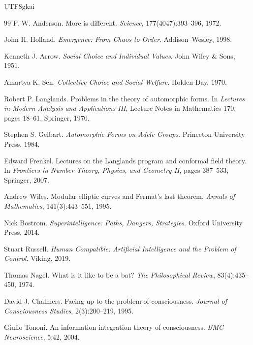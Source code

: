 \documentclass[12pt]{article}
\begin{document}
\begin{CJK*}{UTF8}{gkai}
\begin{thebibliography}{99}
P. W. Anderson.
\newblock More is different.
\newblock \emph{Science}, 177(4047):393--396, 1972.

John H. Holland.
\newblock \emph{Emergence: From Chaos to Order}.
\newblock Addison--Wesley, 1998.

Kenneth J. Arrow.
\newblock \emph{Social Choice and Individual Values}.
\newblock John Wiley \& Sons, 1951.

Amartya K. Sen.
\newblock \emph{Collective Choice and Social Welfare}.
\newblock Holden-Day, 1970.

Robert P. Langlands.
\newblock Problems in the theory of automorphic forms.
\newblock In \emph{Lectures in Modern Analysis and Applications III}, Lecture Notes in Mathematics 170, pages 18--61, Springer, 1970.

Stephen S. Gelbart.
\newblock \emph{Automorphic Forms on Adele Groups}.
\newblock Princeton University Press, 1984.

Edward Frenkel.
\newblock Lectures on the Langlands program and conformal field theory.
\newblock In \emph{Frontiers in Number Theory, Physics, and Geometry II}, pages 387--533, Springer, 2007.

Andrew Wiles.
\newblock Modular elliptic curves and Fermat's last theorem.
\newblock \emph{Annals of Mathematics}, 141(3):443--551, 1995.

Nick Bostrom.
\newblock \emph{Superintelligence: Paths, Dangers, Strategies}.
\newblock Oxford University Press, 2014.

Stuart Russell.
\newblock \emph{Human Compatible: Artificial Intelligence and the Problem of Control}.
\newblock Viking, 2019.

Thomas Nagel.
\newblock What is it like to be a bat?
\newblock \emph{The Philosophical Review}, 83(4):435--450, 1974.

David J. Chalmers.
\newblock Facing up to the problem of consciousness.
\newblock \emph{Journal of Consciousness Studies}, 2(3):200--219, 1995.

Giulio Tononi.
\newblock An information integration theory of consciousness.
\newblock \emph{BMC Neuroscience}, 5:42, 2004.


\end{thebibliography}
\end{CJK*}
\end{document}
